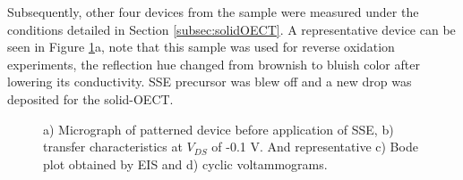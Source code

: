 Subsequently, other four devices from the sample were measured under the conditions detailed in Section \ref{subsec:solidOECT}. A representative device can be seen in Figure \ref{fig:dropcast}a, note that this sample was used for reverse oxidation experiments, the reflection hue changed from brownish to bluish color after lowering its conductivity. SSE precursor was blew off and a new drop was deposited for the solid-OECT. 

\begin{figure}[ht]
    \centering
	\hspace{3em}    
    \qquad
    \caption[Performance of solid-OECT with drop-casted SSE]{a) Micrograph of patterned device before application of SSE, b) transfer characteristics at $V_{DS}$ of -0.1 V. And representative c) Bode plot obtained by EIS and d) cyclic voltammograms.}
    \label{fig:dropcast}
\end{figure}

